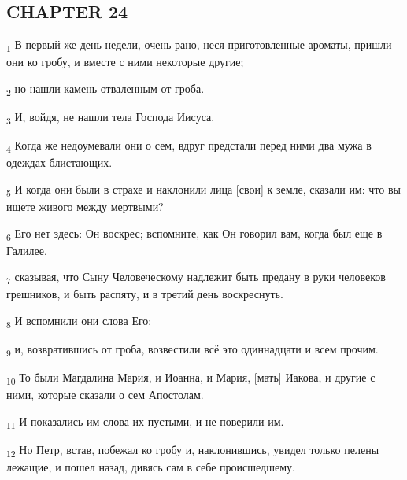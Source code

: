 \subsection{CHAPTER 24}
\begin{tcolorbox}
\textsubscript{1} В первый же день недели, очень рано, неся приготовленные ароматы, пришли они ко гробу, и вместе с ними некоторые другие;
\end{tcolorbox}
\begin{tcolorbox}
\textsubscript{2} но нашли камень отваленным от гроба.
\end{tcolorbox}
\begin{tcolorbox}
\textsubscript{3} И, войдя, не нашли тела Господа Иисуса.
\end{tcolorbox}
\begin{tcolorbox}
\textsubscript{4} Когда же недоумевали они о сем, вдруг предстали перед ними два мужа в одеждах блистающих.
\end{tcolorbox}
\begin{tcolorbox}
\textsubscript{5} И когда они были в страхе и наклонили лица [свои] к земле, сказали им: что вы ищете живого между мертвыми?
\end{tcolorbox}
\begin{tcolorbox}
\textsubscript{6} Его нет здесь: Он воскрес; вспомните, как Он говорил вам, когда был еще в Галилее,
\end{tcolorbox}
\begin{tcolorbox}
\textsubscript{7} сказывая, что Сыну Человеческому надлежит быть предану в руки человеков грешников, и быть распяту, и в третий день воскреснуть.
\end{tcolorbox}
\begin{tcolorbox}
\textsubscript{8} И вспомнили они слова Его;
\end{tcolorbox}
\begin{tcolorbox}
\textsubscript{9} и, возвратившись от гроба, возвестили всё это одиннадцати и всем прочим.
\end{tcolorbox}
\begin{tcolorbox}
\textsubscript{10} То были Магдалина Мария, и Иоанна, и Мария, [мать] Иакова, и другие с ними, которые сказали о сем Апостолам.
\end{tcolorbox}
\begin{tcolorbox}
\textsubscript{11} И показались им слова их пустыми, и не поверили им.
\end{tcolorbox}
\begin{tcolorbox}
\textsubscript{12} Но Петр, встав, побежал ко гробу и, наклонившись, увидел только пелены лежащие, и пошел назад, дивясь сам в себе происшедшему.
\end{tcolorbox}
